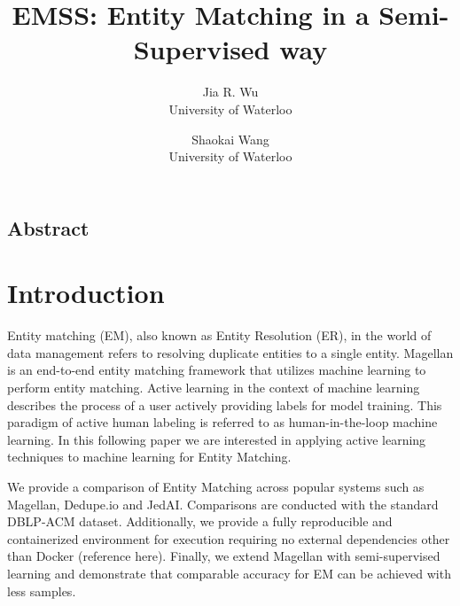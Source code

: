 \documentclass[letterpaper,twocolumn,10pt]{article}
\begin{document}
\date{}

\title{\Large \bf EMSS: Entity Matching in a Semi-Supervised way}




\author{
{\rm Jia R. Wu}\\
University of Waterloo
\and
{\rm Shaokai Wang}\\
University of Waterloo
} %

\maketitle

\thispagestyle{empty}


\subsection*{Abstract}



\section{Introduction}
Entity matching (EM), also known as Entity Resolution (ER), in the world of data management refers to resolving duplicate entities to a single entity. Magellan is an end-to-end entity matching framework that utilizes machine learning to perform entity matching. Active learning in the context of machine learning describes the process of a user actively providing labels for model training. This paradigm of active human labeling is referred to as human-in-the-loop machine learning. In this following paper we are interested in applying active learning techniques to machine learning for Entity Matching. 


We provide a comparison of Entity Matching across popular systems such as Magellan, Dedupe.io and JedAI. Comparisons are conducted with the standard DBLP-ACM dataset. Additionally, we provide a fully reproducible and containerized environment for execution requiring no external dependencies other than Docker (reference here). Finally, we extend Magellan with semi-supervised learning and demonstrate that comparable accuracy for EM can be achieved with less samples. 
\\
\end{document}
